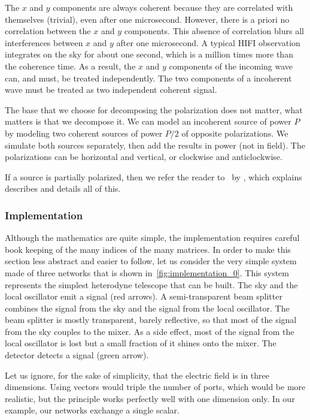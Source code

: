 The $x$ and $y$ components are always coherent because they are correlated with themselves (trivial), even after one microsecond.
However, there is a priori no correlation between the $x$ and $y$ components.
This absence of correlation blurs all interferences between $x$ and $y$ after one microsecond.
A typical HIFI observation integrates on the sky for about one second, which is a million times more than the coherence time.
As a result, the $x$ and $y$ components of the incoming wave can, and must, be treated independently.
The two components of a incoherent wave must be treated as two independent coherent signal.

The base that we choose for decomposing the polarization does not matter, what matters is that we decompose it.
We can model an incoherent source of power $P$ by modeling two coherent sources of power $P/2$ of opposite polarizations.
We simulate both sources separately, then add the results in power (not in field).
The polarizations can be horizontal and vertical, or clockwise and anticlockwise.

If a source is partially polarized, then we refer the reader to~ by \citeauthor{goodman1985statistical} \cite{goodman1985statistical}, which explains describes and details all of this.



\subsubsection{Implementation}
\label{sec:solver_implementation}
Although the mathematics are quite simple, the implementation requires careful book keeping of the many indices of the many matrices.
In order to make this section less abstract and easier to follow, let us consider the very simple system made of three networks that is shown in~\cref{fig:implementation_0}.
This system represents the simplest heterodyne telescope that can be built.
The sky and the local oscillator emit a signal (red arrows).
A semi-transparent beam splitter combines the signal from the sky and the signal from the local oscillator.
The beam splitter is mostly transparent, barely reflective, so that most of the signal from the sky couples to the mixer.
As a side effect, most of the signal from the local oscillator is lost but a small fraction of it shines onto the mixer.
The detector detects a signal (green arrow).

Let us ignore, for the sake of simplicity, that the electric field is in three dimensions.
Using vectors would triple the number of ports, which would be more realistic, but the principle works perfectly well with one dimension only.
In our example, our networks exchange a single scalar.

